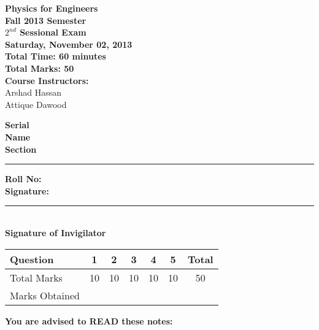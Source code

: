 \documentclass[12pt,a4paper]{article}
\def\QOne{10}
\def\Qtwo{10}
\def\Qthree{10}
\def\Qfour{10}
\def\Qfive{10}
\def\TotalMarks{50}
\begin{document}
\begin{minipage}{0.55\textwidth}
{\LARGE \textbf{Physics for Engineers}}\\[0.15cm]
{\normalsize \textbf{Fall 2013 Semester}}\\
{\Large \textbf{$2^{nd}$ Sessional Exam}}\\
{\normalsize \textbf{Saturday, November 02, 2013}}\\[0.30cm]
{\Large \textbf{Total Time: 60 minutes}}\\[0.15cm]
{\Large \textbf{Total Marks: 50}}\\
\textbf{Course Instructors:}\\
Arshad Hassan\\
Attique Dawood\\
\end{minipage}
\begin{minipage}{0.4\textwidth}
\textbf{Serial} \hrulefill \\[0.25cm]
\textbf{Name} \hrulefill\\[0.25cm]
\textbf{Section} \rule{1cm}{0.2mm} \textbf{Roll No:} \hrulefill\\[0.25cm]
\textbf{Signature:} \hrulefill\\[0.25cm]
\rule{6.6cm}{0.2mm}\\
\textbf{Signature of Invigilator}\\[0.25cm]
\end{minipage}
\begin{table}[H]
\begin{center}
\vspace{0.3cm}
	{\large \begin{tabular}{|l|c|c|c|c|c|c|}
	\hline
		\rule{0pt}{2.6ex} Question & \textbf{1} & \textbf{2} & \textbf{3} & \textbf{4} & \textbf{5} & \textbf{Total}\\
		\hline
		Total Marks \rule{0pt}{2.6ex} & \QOne & \Qtwo & \Qthree & \Qfour & \Qfive & \TotalMarks\\
		\hline
		Marks Obtained \rule{0pt}{2.6ex} & & & & & &\\
	\hline
	\end{tabular}}
\end{center}
\end{table}
\noindent \textbf{You are advised to READ these notes:}
\end{document}
